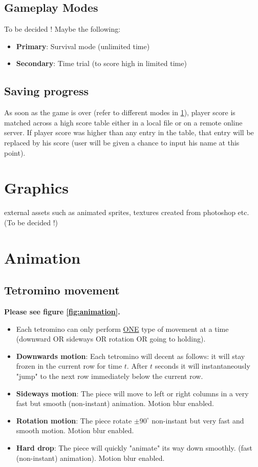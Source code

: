 \documentclass[10pt]{report}
\theoremstyle{definition}
\theoremstyle{remark}
\begin{document}
\section{Gameplay Modes}
\label{sec:gpmodes}
To be decided !
Maybe the following:
\begin{itemize}
\item \textbf{Primary}: Survival mode (unlimited time)
\item \textbf{Secondary}: Time trial (to score high in limited time)
\end{itemize}


\section{Saving progress}
As soon as the game is over (refer to different modes in \ref{sec:gpmodes}), player score is matched across a high score table either in a local file or on a remote online server. If player score was higher than any entry in the table, that entry will be replaced by his score (user will be given a chance to input his name at this point).

\chapter{Graphics}
external assets such as animated sprites, textures created from photoshop etc. (To be decided !)

\chapter{Animation}

\section{Tetromino movement}
\textbf{\large{Please see figure \ref{fig:animation}.}}

\begin{itemize}
\item Each tetromino can only perform \underline{ONE} type of movement at a time (downward OR sideways OR rotation OR going to holding).
\item \textbf{Downwards motion}: Each tetromino will decent as follows: it will stay frozen in the current row for time $t$. After $t$ seconds it will instantaneously "jump" to the next row immediately below the current row.
\item \textbf{Sideways motion}: The piece will move to left or right columns in a very fast but smooth (non-instant) animation. Motion blur enabled.
\item \textbf{Rotation motion}: The piece rotate $\pm90^{\circ}$ non-instant but very fast and smooth motion. Motion blur enabled.
\item \textbf{Hard drop}: The piece will quickly "animate" its way down smoothly. (fast (non-instant) animation). Motion blur enabled.
\end{itemize}
\end{document}
